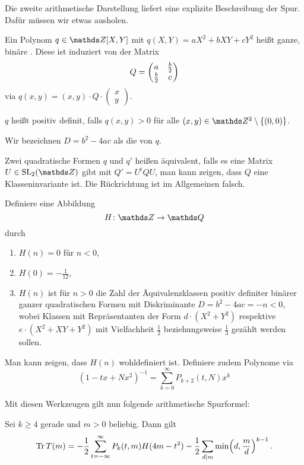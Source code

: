 Die zweite arithmetische Darstellung liefert eine explizite Beschreibung der Spur.
Dafür müssen wir etwas ausholen.

\begin{defi}
	Ein Polynom $q \in \ZZ[X, Y]$ mit $q(X,Y) = aX^2 + bXY + cY^2$ heißt ganze, binäre .
	Diese ist induziert von der Matrix
	\[
	Q = \mymat*{a}{\frac{b}{2}}{\frac{b}{2}}{c}
	\]
	via $q(x,y) = (x, y) \cdot Q \cdot (\begin{smallmatrix} x \\ y \end{smallmatrix})$.
	
	$q$ heißt positiv definit, falls $q(x,y) > 0$ für alle $(x,y) \in \ZZ^2\setminus\{(0,0)\}$.
	
	Wir bezeichnen $D = b^2 - 4ac$ als die  von $q$.
	
	Zwei quadratische Formen $q$ und $q'$ heißen äquivalent, falls es eine Matrix $U \in \SL_2(\ZZ)$ gibt mit $Q' = U^t Q U$, man kann zeigen, dass $Q$ eine Klasseninvariante ist.
	Die Rückrichtung ist im Allgemeinen falsch.
	
	Definiere eine Abbildung
	\[
	H\colon \ZZ \ra \QQ
	\]
	durch
	\begin{enumerate}
		\item $H(n) = 0$ für $n < 0$,
		\item $H(0) = - \frac{1}{12}$,
		\item $H(n)$ ist für $n > 0$ die Zahl der Äquivalenzklassen positiv definiter binärer ganzer quadratischen Formen mit Diskriminante $D = b^2-4ac = -n < 0$, wobei Klassen mit Repräsentanten der Form $d\cdot (X^2 + Y^2)$ respektive $e \cdot (X^2 + XY + Y^2)$ mit Vielfachheit $\frac{1}{2}$ beziehungsweise $\frac{1}{3}$ gezählt werden sollen.
	\end{enumerate}
	Man kann zeigen, dass $H(n)$ wohldefiniert ist.
	Definiere zudem Polynome via
	\[
	(1-tx+Nx^2)^{-1} = \sum_{k=0}^\infty P_{k+2}(t,N) x^k
	\]
\end{defi}

Mit diesen Werkzeugen gilt nun folgende arithmetische Spurformel:

\begin{theorem}
	Sei $k \geq 4$ gerade und $m > 0$ beliebig. Dann gilt
	\begin{equation}\label{eq:arithmetischeSpurformel}
	\operatorname{Tr} T(m) = -\frac{1}{2} \sum_{t=-\infty}^\infty P_k(t,m) H(4m-t^2) - \frac{1}{2} \sum_{d|m} \min\Bigl(d, \frac{m}{d}\Bigr)^{k-1}\,.
	\end{equation}
\end{theorem}


